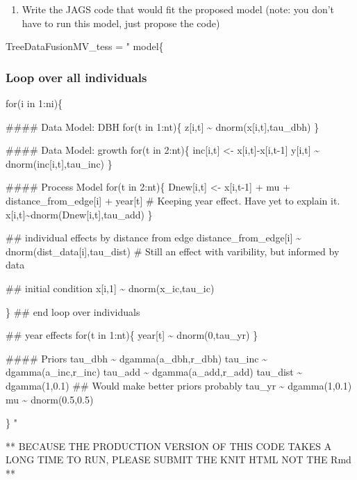 \documentclass[]{article}
\providecommand{\tightlist}{%
  \setlength{\itemsep}{0pt}\setlength{\parskip}{0pt}}
\begin{document}
\begin{enumerate}
\def\labelenumi{\arabic{enumi}.}
\setcounter{enumi}{4}
\tightlist
\item
  Write the JAGS code that would fit the proposed model (note: you don't
  have to run this model, just propose the code)
\end{enumerate}

TreeDataFusionMV\_tess = " model\{

\hypertarget{loop-over-all-individuals}{%
\subsubsection{Loop over all
individuals}\label{loop-over-all-individuals}}

for(i in 1:ni)\{

\#\#\#\# Data Model: DBH for(t in 1:nt)\{ z{[}i,t{]} \textasciitilde{}
dnorm(x{[}i,t{]},tau\_dbh) \}

\#\#\#\# Data Model: growth for(t in 2:nt)\{ inc{[}i,t{]} \textless{}-
x{[}i,t{]}-x{[}i,t-1{]} y{[}i,t{]} \textasciitilde{}
dnorm(inc{[}i,t{]},tau\_inc) \}

\#\#\#\# Process Model for(t in 2:nt)\{ Dnew{[}i,t{]} \textless{}-
x{[}i,t-1{]} + mu + distance\_from\_edge{[}i{]} + year{[}t{]} \# Keeping
year effect. Have yet to explain it.
x{[}i,t{]}\textasciitilde{}dnorm(Dnew{[}i,t{]},tau\_add) \}

\#\# individual effects by distance from edge
distance\_from\_edge{[}i{]} \textasciitilde{}
dnorm(dist\_data{[}i{]},tau\_dist) \# Still an effect with varibility,
but informed by data

\#\# initial condition x{[}i,1{]} \textasciitilde{} dnorm(x\_ic,tau\_ic)

\} \#\# end loop over individuals

\#\# year effects for(t in 1:nt)\{ year{[}t{]} \textasciitilde{}
dnorm(0,tau\_yr) \}

\#\#\#\# Priors tau\_dbh \textasciitilde{} dgamma(a\_dbh,r\_dbh)
tau\_inc \textasciitilde{} dgamma(a\_inc,r\_inc) tau\_add
\textasciitilde{} dgamma(a\_add,r\_add) tau\_dist \textasciitilde{}
dgamma(1,0.1) \#\# Would make better priors probably tau\_yr
\textasciitilde{} dgamma(1,0.1) mu \textasciitilde{} dnorm(0.5,0.5)

\} "

** BECAUSE THE PRODUCTION VERSION OF THIS CODE TAKES A LONG TIME TO RUN,
PLEASE SUBMIT THE KNIT HTML NOT THE Rmd **
\end{document}
